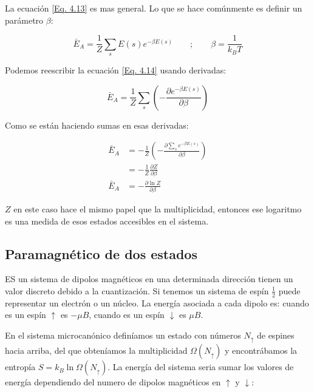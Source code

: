 \documentclass[11pt,fleqn]{book}
\begin{document}
La ecuación \ref{Eq. 4.13} es mas general. Lo que se hace comúnmente es definir un parámetro $\beta$:

\begin{equation}
    \bar{E}_{A}=\frac{1}{Z}\sum_{s} E(s)e^{-\beta E(s)}\qquad;\qquad\beta=\frac{1}{k_{B}T}
    \label{Eq. 4.14}
\end{equation}

Podemos reescribir la ecuación \ref{Eq. 4.14} usando derivadas:

\begin{equation*}
    \bar{E}_{A}=\frac{1}{Z}\sum_{s} \left(-\frac{\partial e^{-\beta E(s)}}{\partial\beta}\right)
\end{equation*}

Como se están haciendo sumas en esas derivadas:

\begin{equation}\begin{split}
        \bar{E}_{A}&=-\frac{1}{Z}\left(-\frac{\partial\sum_{s}e^{-\beta E(s)}}{\partial\beta}\right)\\
        &=-\frac{1}{Z}\frac{\partial Z}{\partial\beta}\\
        \bar{E}_{A}&=-\frac{\partial\ln{Z}}{\partial\beta}
        \end{split}
    \label{Eq. 4.15}
\end{equation}

$Z$ en este caso hace el mismo papel que la multiplicidad, entonces ese logaritmo es una medida de esos estados accesibles en el sistema. 


\subsection{Paramagnético de dos estados}

ES un sistema de dipolos magnéticos en una determinada dirección tienen un valor discreto debido a la cuantización. Si tenemos un sistema de espín $\frac{1}{2}$ puede representar un electrón o un núcleo. La energía asociada a cada dipolo es: cuando es un espín $\uparrow$ es $-\mu B$, cuando es un espín $\downarrow$ es $\mu B$.


En el sistema microcanónico definíamos un estado con números $N_{\uparrow}$ de espines hacia arriba, del que obteníamos la multiplicidad $\Omega(N_{\uparrow})$ y encontrábamos la entropía $S=k_{B}\ln{\Omega(N_{\uparrow})}$. La energía del sistema seria sumar los valores de energía dependiendo del numero de dipolos magnéticos en $\uparrow$ y $\downarrow$: 
\end{document}
